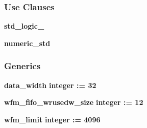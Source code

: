 \subsubsection*{Use Clauses}
 \begin{DoxyCompactItemize}
\item 
{\bf std\+\_\+logic\+\_}   
\item 
{\bf numeric\+\_\+std}   
\end{DoxyCompactItemize}
\subsubsection*{Generics}
 \begin{DoxyCompactItemize}
\item 
{\bf data\+\_\+width} {\bfseries {\bfseries \textcolor{comment}{integer}\textcolor{vhdlchar}{ }\textcolor{vhdlchar}{ }\textcolor{vhdlchar}{\+:}\textcolor{vhdlchar}{=}\textcolor{vhdlchar}{ }\textcolor{vhdlchar}{ } \textcolor{vhdldigit}{32} \textcolor{vhdlchar}{ }}}
\item 
{\bf wfm\+\_\+fifo\+\_\+wrusedw\+\_\+size} {\bfseries {\bfseries \textcolor{comment}{integer}\textcolor{vhdlchar}{ }\textcolor{vhdlchar}{ }\textcolor{vhdlchar}{\+:}\textcolor{vhdlchar}{=}\textcolor{vhdlchar}{ }\textcolor{vhdlchar}{ } \textcolor{vhdldigit}{12} \textcolor{vhdlchar}{ }}}
\item 
{\bf wfm\+\_\+limit} {\bfseries {\bfseries \textcolor{comment}{integer}\textcolor{vhdlchar}{ }\textcolor{vhdlchar}{ }\textcolor{vhdlchar}{\+:}\textcolor{vhdlchar}{=}\textcolor{vhdlchar}{ }\textcolor{vhdlchar}{ } \textcolor{vhdldigit}{4096} \textcolor{vhdlchar}{ }}}
\end{DoxyCompactItemize}

